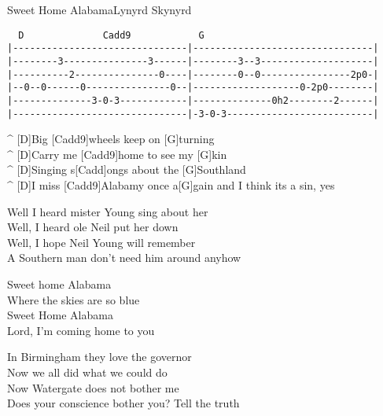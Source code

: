 \begin{song}{Sweet Home Alabama}{Lynyrd Skynyrd}

{\scriptsize
\begin{verbatim}
  D              Cadd9            G
|-------------------------------|--------------------------------|
|--------3---------------3------|--------3--3--------------------|
|----------2---------------0----|--------0--0----------------2p0-|
|--0--0------0---------------0--|-------------------0-2p0--------|
|--------------3-0-3------------|--------------0h2--------2------|
|-------------------------------|-3-0-3--------------------------|
\end{verbatim}
}

\begin{guitar}
^ [D]Big [Cadd9]wheels keep on [G]turning\\
^ [D]Carry me [Cadd9]home to see my [G]kin\\
^ [D]Singing s[Cadd]ongs about the [G]Southland\\
^ [D]I miss [Cadd9]Alabamy once a[G]gain and I think its a sin, yes\\
\end{guitar}

\begin{guitar}
Well I heard mister Young sing about her\\
Well, I heard ole Neil put her down\\
Well, I hope Neil Young will remember\\
A Southern man don't need him around anyhow\\
\end{guitar}

\begin{guitar}
Sweet home Alabama\\
Where the skies are so blue\\
Sweet Home Alabama\\
Lord, I'm coming home to you\\
\end{guitar}

\begin{guitar}
In Birmingham they love the governor\\
Now we all did what we could do\\
Now Watergate does not bother me\\
Does your conscience bother you? Tell the truth\\
\end{guitar}


\end{song}
